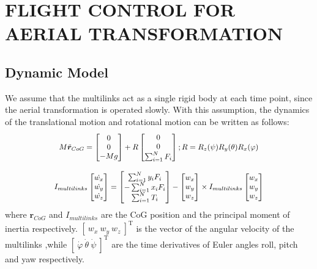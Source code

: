 \section{FLIGHT CONTROL FOR AERIAL TRANSFORMATION}

\subsection{Dynamic Model}
We assume that the multilinks act as a single rigid body at each time point, since the aerial transformation is operated slowly. With this assumption, the dynamics of the translational motion and rotational motion can be written as follows:
\begin{equation}
  \scalebox{0.9}{$
  M\ddot{\bm{r}}_{CoG}=
  \begin{bmatrix}
    0 \\
    0 \\
    -Mg
  \end{bmatrix}
  +R
  \begin{bmatrix}
    0 \\
    0 \\
    \sum^{N}_{i=1}F_{i}
  \end{bmatrix}
  ; \\
  R=R_{z}(\psi)R_{y}(\theta)R_{x}(\varphi) 
  $}
  \label{eq:translation_motioneq}
\end{equation}

\begin{equation}
  \scalebox{0.9}{$
  I_{multilinks}
  \begin{bmatrix}
    \dot{w_x} \\
    \dot{w_y} \\
    \dot{w_z}
  \end{bmatrix}
  =
  \begin{bmatrix}
    \sum^{N}_{i=1} y_{i}F_{i} \\
    -\sum^{N}_{i=1} x_{i}F_{i} \\
    \sum^{N}_{i=1} T_{i}
  \end{bmatrix}
  -
  \begin{bmatrix}
    w_x \\
    w_y \\
    w_z
  \end{bmatrix}
  \times I_{multilinks}
  \begin{bmatrix}
    w_x \\
    w_y \\
    w_z
  \end{bmatrix}
  $}
  \label{eq:rotation_motioneq}
\end{equation}
where $\bm{r}_{CoG}$ and $I_{multilinks}$ are the CoG position and the principal moment of inertia respectively. $[ \ w_x \ w_y \ w_z \ ]^\mathrm{T}$ is the vector of the angular velocity of the multilinks ,while $[ \ \dot{\varphi} \ \dot{\theta} \ \dot{\psi} \ ]^\mathrm{T}$ are the time derivatives of Euler angles roll, pitch and yaw respectively.


